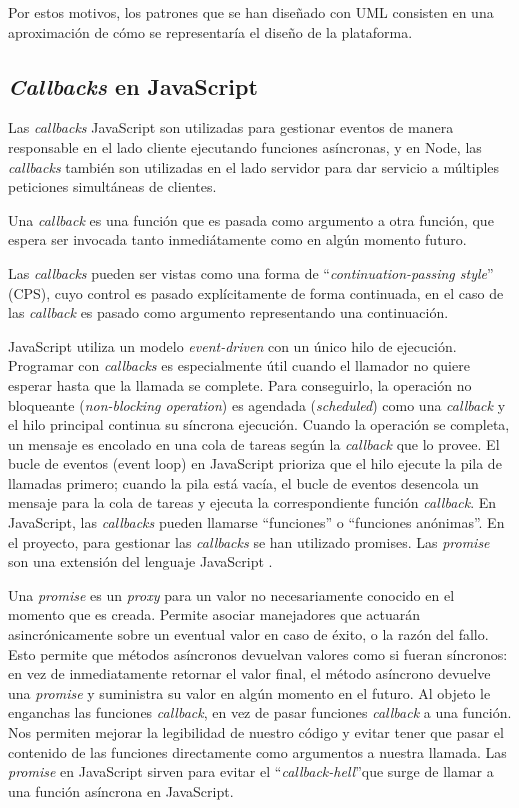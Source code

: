 Por estos motivos, los patrones que se han diseñado con UML consisten en una aproximación de cómo se representaría el diseño de la plataforma.


\subsection{	\textit{Callbacks} en JavaScript}
Las \textit{callbacks} JavaScript son utilizadas para gestionar eventos de manera responsable en el lado cliente ejecutando funciones asíncronas, y en Node, las \textit{callbacks} también son utilizadas en el lado servidor para dar servicio a múltiples peticiones simultáneas de clientes.


Una \textit{callback} es una función que es pasada como argumento a otra función, que espera ser invocada tanto inmediátamente como en algún momento futuro.


Las \textit{callbacks} pueden ser vistas como una forma de ``\textit{continuation-passing style}'' (CPS), cuyo control es pasado explícitamente de forma continuada, en el caso de las \textit{callback} es pasado como argumento representando una continuación.


JavaScript utiliza un modelo \textit{event-driven} con un único hilo de ejecución. Programar con \textit{callbacks} es especialmente útil cuando el llamador no quiere esperar hasta que la llamada se complete. Para conseguirlo, la operación no bloqueante (\textit{non-blocking operation}) es agendada (\textit{scheduled}) como una \textit{callback} y el hilo principal continua su síncrona ejecución. Cuando la operación se completa, un mensaje es encolado en una cola de tareas según la \textit{callback} que lo provee. El bucle de eventos (event loop) en JavaScript prioriza que el hilo ejecute la pila de llamadas primero; cuando la pila está vacía, el bucle de eventos desencola un mensaje para la cola de tareas y ejecuta la correspondiente función \textit{callback}.
En JavaScript, las \textit{callbacks} pueden llamarse “funciones” o “funciones anónimas”.
En el proyecto, para gestionar las \textit{callbacks} se han utilizado promises. Las \textit{promise} son una extensión del lenguaje JavaScript \cite{keheliyagallabaalimesbahivanbeschastnikh2015}.


Una \textit{promise} es un \textit{proxy} para un valor no necesariamente conocido en el momento que es creada. Permite asociar manejadores que actuarán asincrónicamente sobre un eventual valor en caso de éxito, o la razón del fallo. Esto permite que métodos asíncronos devuelvan valores como si fueran síncronos: en vez de inmediatamente retornar el valor final, el método asíncrono devuelve una \textit{promise} y suministra su valor en algún momento en el futuro\cite{promise_objeto}. Al objeto le enganchas las funciones \textit{callback}, en vez de pasar funciones \textit{callback} a una función\cite{promise_mozilla}. Nos permiten mejorar la legibilidad de nuestro código y evitar tener que pasar el contenido de las funciones directamente como argumentos a nuestra llamada. Las \textit{promise} en JavaScript sirven para evitar el ``\textit{callback-hell}''que surge de llamar a una función asíncrona en JavaScript. 


